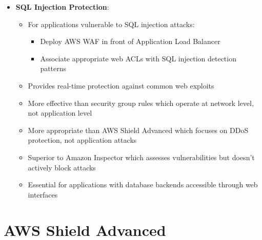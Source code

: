 \documentclass[11pt,a4paper]{report}
\begin{document}
\begin{itemize}
\begin{itemize}
  \item Regional AWS WAF web ACLs with rate-based rules can protect API Gateway endpoints from HTTP flood attacks
  \item Automatically tracks requests per IP address and blocks IPs that exceed defined thresholds
  \item Provides immediate protection against DDoS attacks with minimal operational overhead
  \item More effective than CloudWatch monitoring which only provides detection but not prevention
  \item Simpler to implement than custom Lambda@Edge solutions for rate limiting
\end{itemize}
  \item \textbf{SQL Injection Protection}:
\begin{itemize}
  \item For applications vulnerable to SQL injection attacks:
\begin{itemize}
  \item Deploy AWS WAF in front of Application Load Balancer
  \item Associate appropriate web ACLs with SQL injection detection patterns
\end{itemize}
  \item Provides real-time protection against common web exploits
  \item More effective than security group rules which operate at network level, not application level
  \item More appropriate than AWS Shield Advanced which focuses on DDoS protection, not application attacks
  \item Superior to Amazon Inspector which assesses vulnerabilities but doesn't actively block attacks
  \item Essential for applications with database backends accessible through web interfaces
\end{itemize}
\end{itemize}


\section{AWS Shield Advanced}
\end{document}
